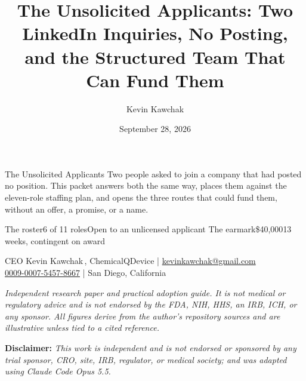 \documentclass[11pt]{article}
\title{The Unsolicited Applicants: Two LinkedIn Inquiries, No Posting, and the Structured Team That Can Fund Them}
\author{Kevin Kawchak}
\date{September 28, 2026}
\begin{document}
\thispagestyle{plain}

%
{The Unsolicited Applicants}%
{Two people asked to join a company that had posted no position. This packet answers both
the same way, places them against the eleven-role staffing plan, and opens the three routes
that could fund them, without an offer, a promise, or a name.}

\vspace{0.15em}

\begin{center}
 \enspace {} \enspace
{} \enspace {} \enspace
{}
\end{center}

\vspace{-0.15em}

%
{The roster}{6 of 11 roles}{Open to an unlicensed applicant}%
{The earmark}{\$40,000}{13 weeks, contingent on award}

\vspace{-0.1em}
\apprule{0.9pt}

\begin{center}\small
CEO Kevin Kawchak\,, ChemicalQDevice \;|\;
\href{mailto:kevinkawchak@gmail.com}{kevinkawchak@gmail.com}\\
\href{https://orcid.org/0009-0007-5457-8667}{0009-0007-5457-8667} \;|\;
San Diego, California
\end{center}

\vspace{-0.25em}
\apprule{0.5pt}

\noindent\footnotesize\textit{Independent research paper and practical adoption
guide. It is not medical or regulatory advice and is not endorsed by the FDA,
NIH, HHS, an IRB, ICH, or any sponsor. All figures derive from the author's
repository sources and are illustrative unless tied to a cited
reference.}\normalsize\par

\vspace{0.12em}

\noindent\footnotesize\textbf{Disclaimer:} \textit{This work is independent and
is not endorsed or sponsored by any trial sponsor, CRO, site, IRB, regulator, or
medical society; and was adapted using Claude Code Opus 5.5.}\normalsize\par
\end{document}
